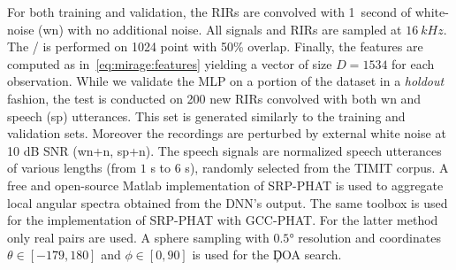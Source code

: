\mynewline
For both training and validation, the \acp{RIR} are convolved with 1~second of white-noise (wn) with no additional noise.
All signals and RIRs are sampled at $\SI{16}{kHz}$.
The \STFT/ is performed on 1024 point with 50\% overlap.
Finally, the features are computed as in~\eqref{eq:mirage:features} yielding a vector of size $D = 1534$ for each observation.
While we validate the MLP on a portion of the dataset in a \textit{holdout} fashion, the test is conducted on 200 new \acp{RIR} convolved with both wn and speech (sp) utterances.
This set is generated similarly to the training and validation sets. Moreover the recordings are perturbed by external white noise at 10 dB SNR (wn+n, sp+n).
The speech signals are normalized speech utterances of various lengths (from $1$ s to $6$ s), randomly selected from the TIMIT corpus.
A free and open-source Matlab implementation of \ac{SRP-PHAT} is used to aggregate local angular spectra obtained from the \ac{DNN}'s output.
The same toolbox is used for the implementation of \ac{SRP-PHAT} with \ac{GCC-PHAT}.
For the latter method only real pairs are used.
A sphere sampling with $\ang{0.5}$ resolution and coordinates $\theta \in [-179, 180]$ and $\phi \in [0, 90]$ is used for the \c{DOA} search.

